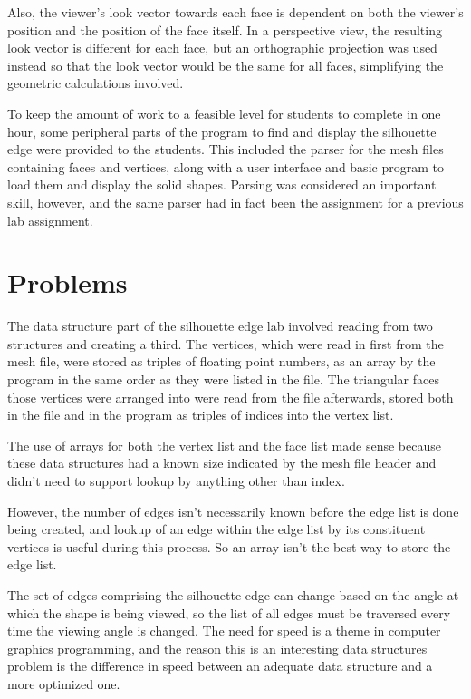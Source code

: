 \documentclass[10pt,twocolumn]{article}
\begin{document}
Also, the viewer's look vector towards each face is dependent on both the viewer's position and the position of the face itself.  In a perspective view, the resulting look vector is different for each face, but an orthographic projection was used instead so that the look vector would be the same for all faces, simplifying the geometric calculations involved.  

To keep the amount of work to a feasible level for students to complete in one hour, some peripheral parts of the program to find and display the silhouette edge were provided to the students.  This included the parser for the mesh files containing faces and vertices, along with a user interface and basic program to load them and display the solid shapes.  Parsing was considered an important skill, however, and the same parser had in fact been the assignment for a previous lab assignment.  

\section{Problems}
The data structure part of the silhouette edge lab involved reading from two structures and creating a third.  The vertices, which were read in first from the mesh file, were stored as triples of floating point numbers, as an array by the program in the same order as they were listed in the file.  The triangular faces those vertices were arranged into were read from the file afterwards, stored both in the file and in the program as triples of indices into the vertex list.  

The use of arrays for both the vertex list and the face list made sense because these data structures had a known size indicated by the mesh file header and didn't need to support lookup by anything other than index.  

However, the number of edges isn't necessarily known before the edge list is done being created, and lookup of an edge within the edge list by its constituent vertices is useful during this process.  So an array isn't the best way to store the edge list.  

The set of edges comprising the silhouette edge can change based on the angle at which the shape is being viewed, so the list of all edges must be traversed every time the viewing angle is changed.  The need for speed is a theme in computer graphics programming, and the reason this is an interesting data structures problem is the difference in speed between an adequate data structure and a more optimized one.  
\end{document}
